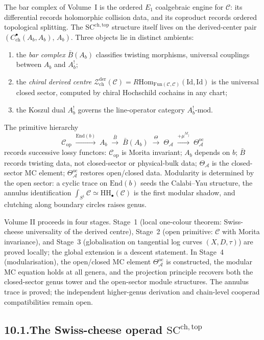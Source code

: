 \documentclass[11pt,reqno]{amsart}
\theoremstyle{definition}
\theoremstyle{remark}
\providecommand{\cA}{\mathcal{A}}
\providecommand{\cC}{\mathcal{C}}
\providecommand{\cZ}{\mathcal{Z}}
\providecommand{\barB}{\bar{B}}
\providecommand{\Hom}{\mathrm{Hom}}
\providecommand{\SCchtop}{\mathrm{SC}^{\mathrm{ch,top}}}
\providecommand{\HH}{\mathrm{HH}}
\providecommand{\Fun}{\mathrm{Fun}}
\providecommand{\End}{\mathrm{End}}
\providecommand{\der}{\mathrm{der}}
\providecommand{\ch}{\mathrm{ch}}
\providecommand{\op}{\mathrm{op}}
\providecommand{\oc}{\mathrm{oc}}
\providecommand{\Id}{\mathrm{Id}}
\numberwithin{equation}{section}
\begin{document}
The bar complex of Volume~I is the ordered $E_1$ coalgebraic
engine for $\cC$: its differential records holomorphic
collision data, and its coproduct records ordered topological
splitting. The $\SCchtop$ structure itself lives on the
derived-center pair
$(C^\bullet_{\mathrm{ch}}(A_b, A_b),\, A_b)$.
Three objects lie in distinct ambients:
\begin{enumerate}[label=\textup{(\roman*)},nosep]
\item the \emph{bar complex} $\barB(A_b)$ classifies twisting
morphisms, universal couplings between $A_b$ and $A_b^!$;
\item the \emph{chiral derived centre}
$\cZ^{\der}_{\ch}(\cC) =
R\Hom_{\Fun(\cC,\cC)}(\Id, \Id)$ is the universal closed sector,
computed by chiral Hochschild cochains in any chart;
\item the Koszul dual $A_b^!$ governs the line-operator
category $A_b^!\text{-mod}$.
\end{enumerate}
The primitive hierarchy
\[
\cC_{\op}
\;\xrightarrow{\End(b)}\;
A_b
\;\xrightarrow{\barB}\;
\barB(A_b)
\;\xrightarrow{\Theta}\;
\Theta_\cA
\;\xrightarrow{+\mu^{M_j}}\;
\Theta^{\oc}_\cA
\]
records successive lossy functors: $\cC_{\op}$ is Morita
invariant; $A_b$ depends on $b$; $\barB$ records twisting data,
not closed-sector or physical-bulk data; $\Theta_\cA$ is the
closed-sector MC element;
$\Theta^{\oc}_\cA$ restores open/closed data. Modularity is
determined by the open sector: a cyclic trace on $\End(b)$
seeds the Calabi--Yau structure, the annulus identification
$\int_{S^1} \cC \simeq \HH_\bullet(\cC)$ is the first modular
shadow, and clutching along boundary circles raises genus.

Volume II proceeds in four stages. Stage~1 (local one-colour
theorem: Swiss-cheese universality of the derived centre),
Stage~2 (open primitive: $\cC$ with Morita invariance), and
Stage~3 (globalisation on tangential log curves $(X, D, \tau)$)
are proved locally; the global extension is a descent statement. In
Stage~4 (modularisation), the open/closed MC
element $\Theta^{\oc}_\cA$ is constructed, the modular MC
equation holds at all genera, and the projection principle
recovers both the closed-sector genus tower and the
open-sector module structures. The annulus trace is proved;
the independent higher-genus derivation and chain-level
cooperad compatibilities remain open.

\subsection*{10.1.\enspace The Swiss-cheese operad
$\SCchtop$}
\end{document}
